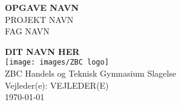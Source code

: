 \documentclass[11pt, a4paper]{report}
\begin{document}
    \begin{titlepage}
        \vspace*{1cm}
        \centering\Huge{
            \textbf{OPGAVE NAVN}} \\
        \vspace{0.2cm}
        \large{
            PROJEKT NAVN  \\}
        \small{FAG NAVN \\}

        \vspace{0.3cm}
        \large\textbf{DIT NAVN HER} \\
        \vfill
        \texttt{[image: images/ZBC logo]} \\
        \vfill
        ZBC Handels og Teknisk Gymnasium Slagelse \\
        Vejleder(e): VEJLEDER(E)  \\
        \today
    \end{titlepage}

    

    \tableofcontents
    
    
    
    
    
    




    \printbibliography[heading=bibintoc]\nocite{*}
    
\end{document}
